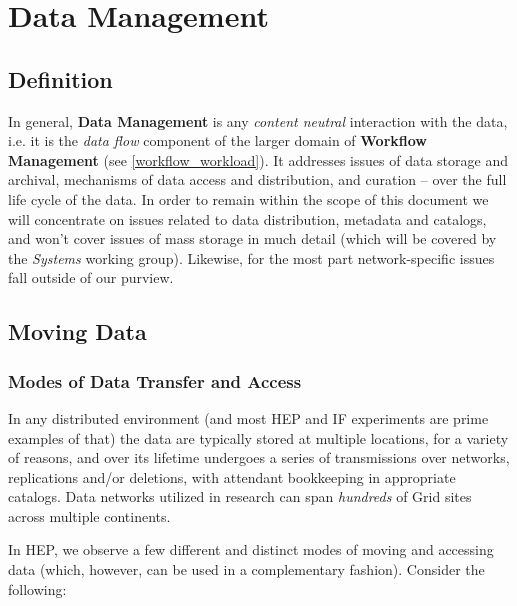 \section{Data Management}
\label{data}


\subsection{Definition}
In general, \textbf{Data Management} is any \textit{content neutral} interaction with the data, i.e. it is the \textit{data flow}
component of the larger domain of  \textbf{Workflow Management} (see \ref{workflow_workload}). It addresses issues of data storage
and archival, mechanisms of data access and distribution, and  curation -- over the full life cycle of the data. In order to remain within
the scope of this document we will
concentrate on issues related to data distribution, metadata and catalogs, and won't cover issues of mass storage
in much detail (which will be covered by the \textit{Systems} working group). Likewise, for the most part network-specific issues fall outside of our purview.



\subsection{Moving Data}
\subsubsection{Modes of Data Transfer and Access}
\label{data_xfer}
In any distributed environment (and most HEP and IF experiments are prime examples of that) the data are typically stored at multiple locations,
for a variety of reasons, and over its lifetime undergoes a series of transmissions over networks, replications and/or deletions, with attendant bookkeeping
in appropriate catalogs. Data networks utilized in research can span \textit{hundreds} of Grid sites across multiple continents.

In HEP, we observe a few different and distinct modes of moving and accessing data (which, however, can be used in a complementary fashion).
Consider the following:

